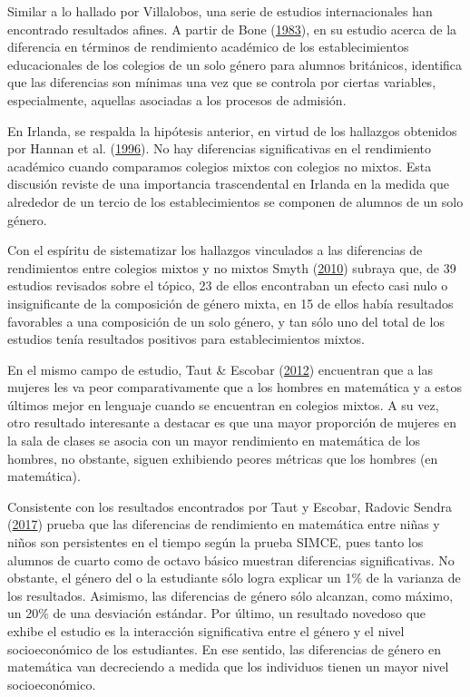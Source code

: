 \documentclass[
]{article}
\begin{document}
Similar a lo hallado por Villalobos, una serie de estudios
internacionales han encontrado resultados afines. A partir de Bone
(\protect\hyperlink{ref-bone_girls_1983}{1983}), en su estudio acerca de
la diferencia en términos de rendimiento académico de los
establecimientos educacionales de los colegios de un solo género para
alumnos británicos, identifica que las diferencias son mínimas una vez
que se controla por ciertas variables, especialmente, aquellas asociadas
a los procesos de admisión.

En Irlanda, se respalda la hipótesis anterior, en virtud de los
hallazgos obtenidos por Hannan et al.
(\protect\hyperlink{ref-hannan_coeducation_1996}{1996}). No hay
diferencias significativas en el rendimiento académico cuando comparamos
colegios mixtos con colegios no mixtos. Esta discusión reviste de una
importancia trascendental en Irlanda en la medida que alrededor de un
tercio de los establecimientos se componen de alumnos de un solo género.

Con el espíritu de sistematizar los hallazgos vinculados a las
diferencias de rendimientos entre colegios mixtos y no mixtos Smyth
(\protect\hyperlink{ref-smyth_singlesex_2010}{2010}) subraya que, de 39
estudios revisados sobre el tópico, 23 de ellos encontraban un efecto
casi nulo o insignificante de la composición de género mixta, en 15 de
ellos había resultados favorables a una composición de un solo género, y
tan sólo uno del total de los estudios tenía resultados positivos para
establecimientos mixtos.

En el mismo campo de estudio, Taut \& Escobar
(\protect\hyperlink{ref-taut_efecto_2012}{2012}) encuentran que a las
mujeres les va peor comparativamente que a los hombres en matemática y a
estos últimos mejor en lenguaje cuando se encuentran en colegios mixtos.
A su vez, otro resultado interesante a destacar es que una mayor
proporción de mujeres en la sala de clases se asocia con un mayor
rendimiento en matemática de los hombres, no obstante, siguen exhibiendo
peores métricas que los hombres (en matemática).

Consistente con los resultados encontrados por Taut y Escobar, Radovic
Sendra (\protect\hyperlink{ref-radovicsendra_diferencias_2017}{2017})
prueba que las diferencias de rendimiento en matemática entre niñas y
niños son persistentes en el tiempo según la prueba SIMCE, pues tanto
los alumnos de cuarto como de octavo básico muestran diferencias
significativas. No obstante, el género del o la estudiante sólo logra
explicar un 1\% de la varianza de los resultados. Asimismo, las
diferencias de género sólo alcanzan, como máximo, un 20\% de una
desviación estándar. Por último, un resultado novedoso que exhibe el
estudio es la interacción significativa entre el género y el nivel
socioeconómico de los estudiantes. En ese sentido, las diferencias de
género en matemática van decreciendo a medida que los individuos tienen
un mayor nivel socioeconómico.
\end{document}
